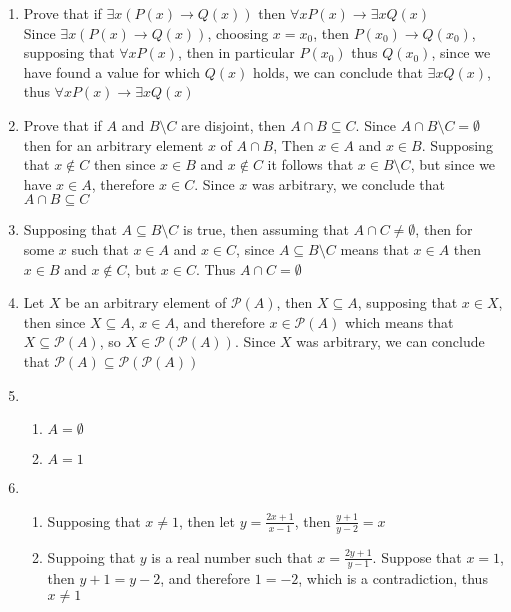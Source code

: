 \begin{enumerate}
    \item
    Prove that if $\exists x (P(x) \rightarrow Q(x))$ then $\forall x P(x) \rightarrow \exists x Q(x)$ \\
    Since $\exists x (P(x) \rightarrow Q(x))$, choosing $x = x_0$, then $P(x_0) \rightarrow Q(x_0)$, supposing that $\forall x P(x)$, then in particular $P(x_0)$ thus $Q(x_0)$, since we have found a value for which $Q(x)$ holds, we can conclude that $\exists x Q(x)$, thus $\forall x P(x) \rightarrow \exists x Q(x)$
    \item
    Prove that if $A$ and $B \setminus C$ are disjoint, then $A \cap B \subseteq C$.
    Since $A \cap B \setminus C = \emptyset$ then for an arbitrary element $x$ of $A \cap B$, Then $x \in A$ and $x \in B$. Supposing that $x \notin C$ then since $x \in B$ and $x \notin C$ it follows that $x \in B \setminus C$, but since we have $x \in A$, therefore $x \in C$. Since $x$ was arbitrary, we conclude that $A \cap B \subseteq C$
    \item 
    Supposing that $A \subseteq B \setminus C$ is true, then assuming that $A \cap C \neq \emptyset$, then for some $x$ such that $x \in A$ and $x \in C$, since $A \subseteq B \setminus C$ means that $x \in A$ then $x \in B$ and $x \notin C$, but $x \in C$. Thus $A \cap C = \emptyset$
    \item
    Let $X$ be an arbitrary element of $\mathscr{P} (A)$, then $X \subseteq A$, supposing that $x \in X$, then since $X \subseteq A$, $x \in A$, and therefore $x \in \mathscr{P} (A)$ which means that $X \subseteq \mathscr{P} (A)$, so $X \in \mathscr{P} (\mathscr{P} (A))$. Since $X$ was arbitrary, we can conclude that $\mathscr{P} (A) \subseteq \mathscr{P} (\mathscr{P} (A))$
    \item
    \begin{enumerate}
        \item $A = \emptyset$
        \item $A = {1}$
    \end{enumerate}
    \item
    \begin{enumerate}
        \item 
        Supposing that $x \neq 1$, then let $y = \frac{2x + 1}{x - 1}$, then $\frac{y + 1}{y - 2} = x$
        \item 
        Suppoing that $y$ is a real number such that $x = \frac{2y + 1}{y - 1}$. Suppose that $x = 1$, then $y + 1 = y - 2$, and therefore $1 = -2$, which is a contradiction, thus $x \neq 1$

\end{enumerate}
\end{enumerate}
